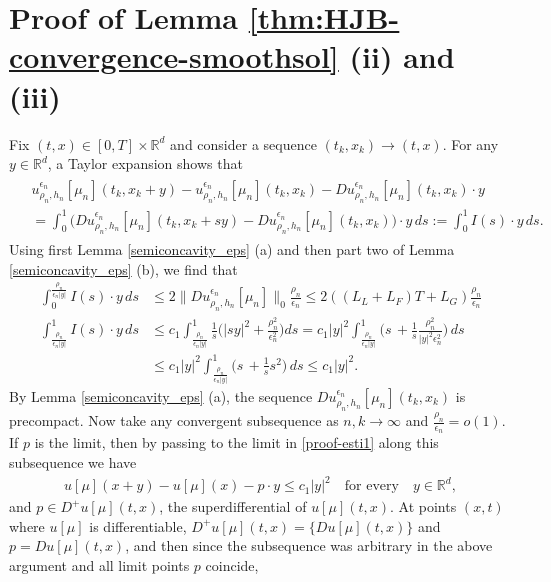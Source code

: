 \documentclass[a4paper,  twoside, 10pt, leqno]{amsart}
\newcommand{\rd}{\mathbb{R}^d}
\theoremstyle{remark}
\theoremstyle{definition}
\begin{document}
\section{Proof of Lemma \ref{thm:HJB-convergence-smoothsol} (ii) and (iii)}\label{app:gradlim}
Fix $(t,x)\in [0,T]\times \rd$ and consider a sequence $(t_k,x_k) \to (t,x)$. For any $y\in \rd$, a Taylor expansion shows that
\begin{align}\label{proof-esti1}
\begin{split}
    & u_{\rho_{n}, h_{n}}^{\epsilon_{n}} [ \mu_{n} ](t_k, x_k+y) - u_{\rho_{n}, h_{n}}^{\epsilon_{n}} [ \mu_{n} ](t_k,x_k) - Du_{\rho_{n}, h_{n}}^{\epsilon_{n}} [ \mu_{n} ](t_k, x_k)\cdot y \\
    & = \int_0^1 \big(Du_{\rho_{n}, h_{n}}^{\epsilon_{n}} [ \mu_{n} ](t_k, x_k+sy) - Du_{\rho_{n}, h_{n}}^{\epsilon_{n}} [ \mu_{n} ] (t_k, x_k) \big)\cdot y \,  ds := \int_0^1 I(s)\cdot y \, ds.
\end{split}
\end{align} 
Using first Lemma \ref{semiconcavity_eps} (a) and then part two of Lemma \ref{semiconcavity_eps}  (b), we find that
 \begin{align*} 
 \int_0^{\frac{\rho_n}{\epsilon_n|y|}} I(s) \cdot y \, ds & \leq   2 \|Du_{\rho_{n}, h_{n}}^{\epsilon_{n}} [ \mu_{n} ]\|_0 \frac{\rho_n}{\epsilon_n}\leq 2 ( ( L_{L} + L_{F} )T + L_{G} ) \frac{\rho_n}{\epsilon_n}\\
 \int^1_{\frac{\rho_n}{\epsilon_n|y|}} I(s) \cdot y \, ds   
 &\leq  c_1 \int^1_{\frac{\rho_n}{\epsilon_n|y|}}  \frac{1}{s} \Big(|sy|^2 + \frac{\rho_n^2}{\epsilon_n^2}\Big) ds = c_1  |y|^2 \int^1_{\frac{\rho_n}{\epsilon_n|y|}} \Big( s \,  +   \frac1{s}\frac{\rho_n^2}{|y|^2\epsilon_n^2}  \Big) \, ds \\
 &\leq c_1  |y|^2 \int^1_{\frac{\rho_n}{\epsilon_n|y|}} \Big( s \,  +   \frac1{s}s^2  \Big) \, ds \leq c_1 |y|^2. %
 \end{align*}
By Lemma \ref{semiconcavity_eps} (a), the sequence $Du_{\rho_{n}, h_{n}}^{\epsilon_{n}} [ \mu_{n} ](t_k, x_k)$ is precompact. Now take any convergent subsequence as $n,k\to \infty$ and $\frac{\rho_n}{\epsilon_n}=o(1)$. If $p$ is the limit, then by passing to the limit in \eqref{proof-esti1} along this subsequence we have
 \begin{align*}
     u[\mu](x+y) - u[\mu](x) - p \cdot y \leq c_1 |y|^2 \quad \text{for every} \quad y \in \rd,
 \end{align*}
 and $p \in D^+u[\mu](t,x)$, the superdifferential of $u[\mu](t,x)$. At points $(x,t)$ where $u[\mu]$ is differentiable, $D^+u[\mu](t,x)=\{Du[\mu](t,x)\}$ and $p= Du[\mu](t,x)$, and then since the subsequence was arbitrary in the above argument and all limit points $p$ coincide,
\end{document}
